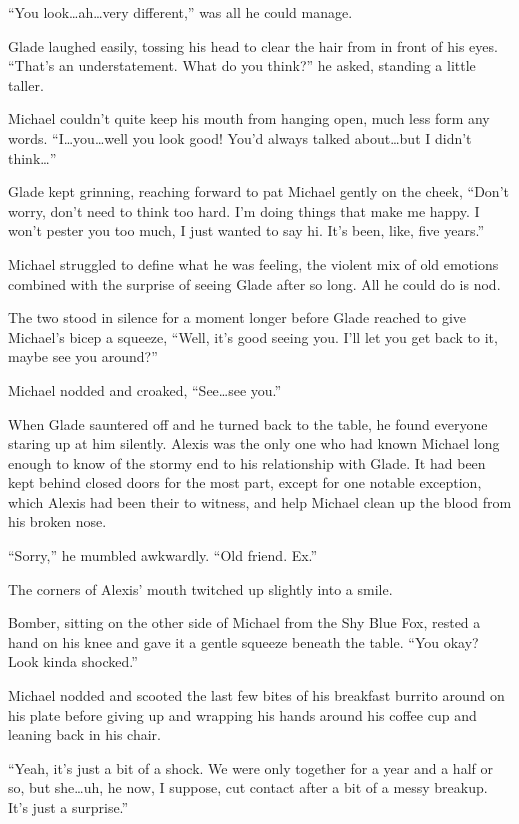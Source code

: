 ``You look\ldots{}ah\ldots{}very different,'' was all he could manage.

Glade laughed easily, tossing his head to clear the hair from in front of his eyes.  ``That's an understatement.  What do you think?'' he asked, standing a little taller.

Michael couldn't quite keep his mouth from hanging open, much less form any words.  ``I\ldots{}you\ldots{}well you look good!  You'd always talked about\ldots{}but I didn't think\ldots{}''

Glade kept grinning, reaching forward to pat Michael gently on the cheek, ``Don't worry, don't need to think too hard.  I'm doing things that make me happy.  I won't pester you too much, I just wanted to say hi.  It's been, like, five years.''

Michael struggled to define what he was feeling, the violent mix of old emotions combined with the surprise of seeing Glade after so long.  All he could do is nod.

The two stood in silence for a moment longer before Glade reached to give Michael's bicep a squeeze, ``Well, it's good seeing you.  I'll let you get back to it, maybe see you around?''

Michael nodded and croaked, ``See\ldots{}see you.''

When Glade sauntered off and he turned back to the table, he found everyone staring up at him silently. Alexis was the only one who had known Michael long enough to know of the stormy end to his relationship with Glade.  It had been kept behind closed doors for the most part, except for one notable exception, which Alexis had been their to witness, and help Michael clean up the blood from his broken nose.

``Sorry,'' he mumbled awkwardly.  ``Old friend.  Ex.''

The corners of Alexis' mouth twitched up slightly into a smile.

Bomber, sitting on the other side of Michael from the Shy Blue Fox, rested a hand on his knee and gave it a gentle squeeze beneath the table.  ``You okay?  Look kinda shocked.''

Michael nodded and scooted the last few bites of his breakfast burrito around on his plate before giving up and wrapping his hands around his coffee cup and leaning back in his chair.

``Yeah, it's just a bit of a shock.  We were only together for a year and a half or so, but she\ldots{}uh, he now, I suppose, cut contact after a bit of a messy breakup. It's just a surprise.''

